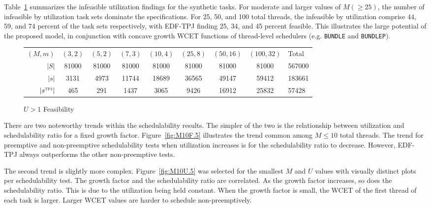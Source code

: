\documentclass[a4paper,UKenglish,cleveref,autoref,english]{lipics-v2019}
\newcommand{\bundlep}{\texttt{BUNDLEP}}
\newcommand{\bundle}{\texttt{BUNDLE}}
\begin{document}
Table~\ref{table:by-m} summarizes the infeasible utilization
findings for the synthetic tasks. For moderate and larger values of
${M (\ge 25)}$, the number of infeasible by utilization task sets
dominate the specifications. For 25, 50, and 100 total threads, the
infeasible by utilization comprise 44, 59, and 74 percent of the task
sets respectively, with EDF-TPJ finding 25, 34, and 45 percent 
feasible. This illustrates the large potential of the proposed model,
in conjunction with concave growth WCET functions of
thread-level schedulers (e.g. \bundle{} and \bundlep{}).

\begin{figure}[ht]
  \centering
  \begin{tabular}{|r||c|c|c|c|c|c|c||l|}
\hline
${(M, m)}$ & ${(3, 2)}$ & ${(5, 2)}$ & ${(7, 3)}$ & ${(10, 4)}$ & ${(25, 8)}$ & ${(50, 16)}$ & ${(100, 32)}$ & Total \\
${|S|}$ & 81000 & 81000 & 81000 & 81000 & 81000 & 81000 & 81000 & 567000 \\
${|s|}$ & 3131 & 4973 & 11744 & 18689 & 36565 & 49147 & 59412 & 183661 \\
${|s^{\text{\sc{tpj}}}{}|}$ & 465 & 291 & 1437 & 3065 & 9426 & 16912 & 25832 & 57428 \\
\hline
\end{tabular}
\caption{${U > 1}$ Feasibility}
\label{table:by-m}
\end{figure}

There are two noteworthy trends within the schedulability results.
The simpler of the two is the relationship between utilization and
schedulability ratio for a fixed growth
factor. Figure~\ref{fig:M10F.5} illustrates the trend common among ${M
  \le 10}$ total threads. The trend for preemptive and non-preemptive
schedulability tests when utilization increases is for the
schedulability ratio to decrease. However, EDF-TPJ always outperforms 
the other non-preemptive tests. 

The second trend is slightly more complex. Figure~\ref{fig:M10U.5} was
selected for the smallest ${M}$ and ${U}$ values with visually
distinct plots per schedulability test. The growth factor and the
schedulability ratio are correlated. As the growth factor increases,
so does the schedulability ratio. This is due to the utilization being
held constant. When the growth factor is small, the WCET of the first
thread of each task is larger. Larger WCET values are harder to
schedule non-preemptively.  
\end{document}
